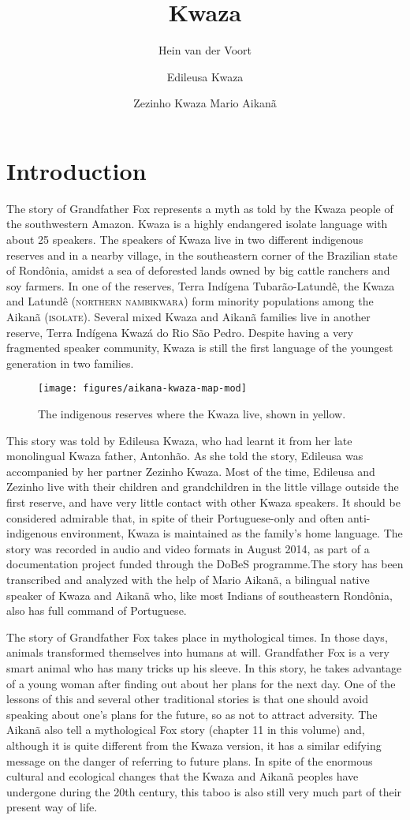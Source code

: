 \documentclass[output=paper,
modfonts,nonflat
]{langsci/langscibook}
\author{Hein van der Voort\affiliation{Museu Paraense Emílio Goeldi}%
\and Edileusa Kwaza%
\and Zezinho Kwaza%
\lastand Mario Aikanã%
}%
\title{Kwaza}
\begin{document}
\section{Introduction} 
 
The story of Grandfather Fox represents a myth as told by the Kwaza people of the southwestern Amazon. Kwaza is a highly endangered isolate language with about 25 speakers. The speakers of Kwaza live in two different indigenous reserves and in a nearby village, in the southeastern corner of the Brazilian state of Rondônia, amidst a sea of deforested lands owned by big cattle ranchers and soy farmers. In one of the reserves, Terra Indígena Tubarão-Latundê, the Kwaza and Latundê (\textsc{northern nambikwara}) form minority populations among the Aikanã (\textsc{isolate}). Several mixed Kwaza and Aikanã families live in another reserve, Terra Indígena Kwazá do Rio São Pedro. Despite having a very fragmented speaker community, Kwaza is still the first language of the youngest generation in two families. 

\begin{figure} 

\texttt{[image: figures/aikana-kwaza-map-mod]}
  \caption{The indigenous reserves where the Kwaza live, shown in yellow.}
\end{figure}

This story was told by Edileusa Kwaza, who had learnt it from her late monolingual Kwaza father, Antonhão. As she told the story, Edileusa was accompanied by her partner Zezinho Kwaza. Most of the time, Edileusa and Zezinho live with their children and grandchildren in the little village outside the first reserve, and have very little contact with other Kwaza speakers. It should be considered admirable that, in spite of their Portuguese-only and often anti-indigenous environment, Kwaza is maintained as the family's home language. The story was recorded in audio and video formats in August 2014, as part of a documentation project funded through the DoBeS programme.The story has been transcribed and analyzed with the help of Mario Aikanã, a bilingual native speaker of Kwaza and Aikanã who, like most Indians of southeastern Rondônia, also has full command of Portuguese.

  The story of Grandfather Fox takes place in mythological times. In those days, animals transformed themselves into humans at will. Grandfather Fox is a very smart animal who has many tricks up his sleeve. In this story, he takes advantage of a young woman after finding out about her plans for the next day. One of the lessons of this and several other traditional stories is that one should avoid speaking about one’s plans for the future, so as not to attract adversity. The Aikanã also tell a mythological Fox story (chapter 11 in this volume) and, although it is quite different from the Kwaza version, it has a similar edifying message on the danger of referring to future plans. In spite of the enormous cultural and ecological changes that the Kwaza and Aikanã peoples have undergone during the 20th century, this taboo is also still very much part of their present way of life.
\end{document}
